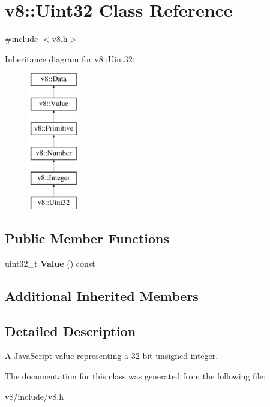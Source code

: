 \hypertarget{classv8_1_1Uint32}{\section{v8\-:\-:Uint32 Class Reference}
\label{classv8_1_1Uint32}
}


{\ttfamily \#include $<$v8.\-h$>$}

Inheritance diagram for v8\-:\-:Uint32\-:\begin{figure}[H]
\begin{center}
\leavevmode
\includegraphics[height=6.000000cm]{classv8_1_1Uint32}
\end{center}
\end{figure}
\subsection*{Public Member Functions}
\begin{DoxyCompactItemize}
\item 
\hypertarget{classv8_1_1Uint32_ad59790c380f4de98c4cc479140812fe0}{uint32\-\_\-t {\bfseries Value} () const }\label{classv8_1_1Uint32_ad59790c380f4de98c4cc479140812fe0}

\end{DoxyCompactItemize}
\subsection*{Additional Inherited Members}


\subsection{Detailed Description}
A Java\-Script value representing a 32-\/bit unsigned integer. 

The documentation for this class was generated from the following file\-:\begin{DoxyCompactItemize}
\item 
v8/include/v8.\-h\end{DoxyCompactItemize}
